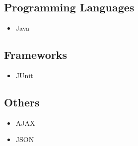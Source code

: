 \documentclass[hidelinks, 12pt, oneside]{article}
\begin{document}
	\subsection{Programming Languages}
	\begin{itemize}
	\item Java
	\end{itemize}
	\subsection{Frameworks}
	\begin{itemize}
	\item JUnit
	\end{itemize}
	\subsection{Others}
	\begin{itemize}
	\item AJAX
	\item JSON
	\end{itemize}					        		 
	 
\end{document}
